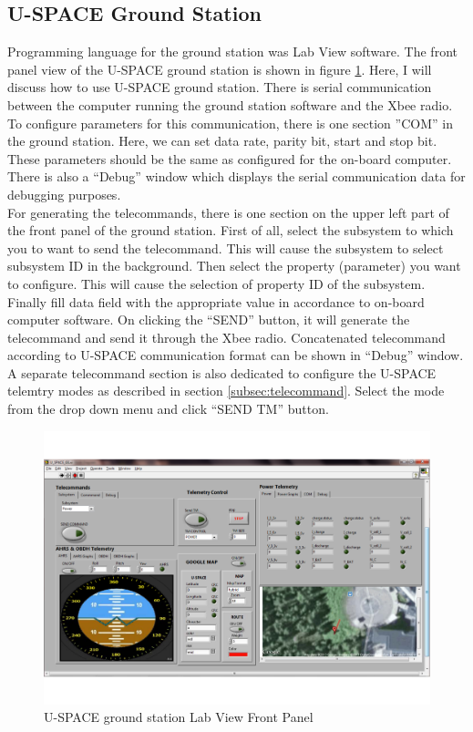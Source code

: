 \subsection{U-SPACE Ground Station}
Programming language for the ground station was Lab View software. The front panel view of the \ac{U-SPACE} ground station is shown in figure \ref{fig:Labview_ground_station}. Here, I will discuss how to use \ac{U-SPACE} ground station. There is serial communication between the computer running the ground station software and the Xbee radio. To configure parameters for this communication, there is one section ''COM'' in the ground station. Here, we can set data rate, parity bit, start and stop bit. These parameters should be the same as configured for the on-board computer. There is also a ``Debug'' window which displays the serial communication data for debugging purposes. \\
%
For generating the telecommands, there is one section on the upper left part of the front panel of the ground station. First of all, select the subsystem to which you to want to send the telecommand. This will cause the subsystem to select subsystem ID in the background. Then select the property (parameter) you want to configure. This will cause the selection of property ID of the subsystem. Finally fill data field with the appropriate value in accordance to on-board computer software. On clicking the ``SEND'' button, it will generate the telecommand and send it through the Xbee radio. Concatenated telecommand according to \ac{U-SPACE} communication format can be shown in ``Debug'' window. A separate telecommand section is also dedicated to configure the \ac{U-SPACE} telemtry modes as described in section \ref{subsec:telecommand}. Select the mode from the drop down menu and click ``SEND TM'' button.
\\
\begin{figure}[bht]
\centering
\includegraphics[scale=0.5]{figures/GS.pdf}
\caption{U-SPACE ground station Lab View Front Panel}
\label{fig:Labview_ground_station}
\end{figure}
